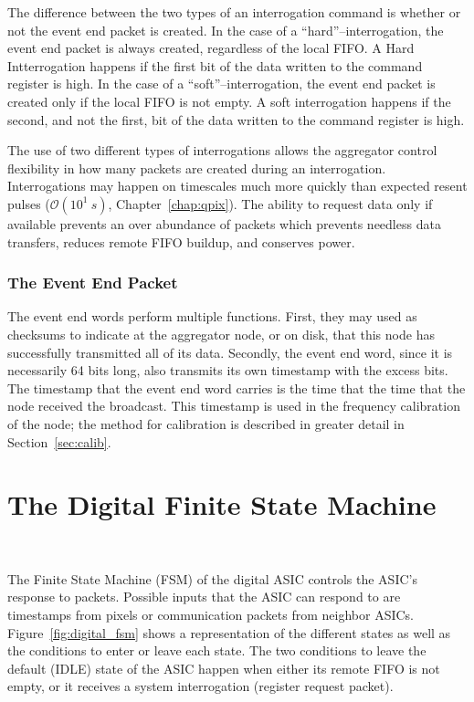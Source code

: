 The difference between the two types of an interrogation command is whether or not the event end packet is created.
In the case of a ``hard''--interrogation, the event end packet is always created, regardless of the local FIFO.
A Hard Intterrogation happens if the first bit of the data written to the command register is high.
In the case of a ``soft''--interrogation, the event end packet is created only if the local FIFO is not empty.
A soft interrogation happens if the second, and not the first, bit of the data written to the command register is high.

The use of two different types of interrogations allows the aggregator control flexibility in how many packets are created during an interrogation.
Interrogations may happen on timescales much more quickly than expected resent pulses ($\mathcal{O}(10^{1}~\unit{s})$, Chapter~\ref{chap:qpix}).
The ability to request data only if available prevents an over abundance of packets which prevents needless data transfers, reduces remote FIFO buildup, and conserves power.

\subsubsection{The Event End Packet}

The event end words perform multiple functions.
First, they may used as checksums to indicate at the aggregator node, or on disk, that this node has successfully transmitted all of its data.
Secondly, the event end word, since it is necessarily 64 bits long, also transmits its own timestamp with the excess bits.
The timestamp that the event end word carries is the time that the time that the node received the broadcast.
This timestamp is used in the frequency calibration of the node; the method for calibration is described in greater detail in Section~\ref{sec:calib}.

\section{The Digital Finite State Machine}~\label{sec:digital_fsm}

The Finite State Machine (FSM) of the digital ASIC controls the ASIC's response to packets.
Possible inputs that the ASIC can respond to are timestamps from pixels or communication packets from neighbor ASICs.
Figure~\ref{fig:digital_fsm} shows a representation of the different states as well as the conditions to enter or leave each state.
The two conditions to leave the default (IDLE) state of the ASIC happen when either its remote FIFO is not empty, or it receives a system interrogation (register request packet).

